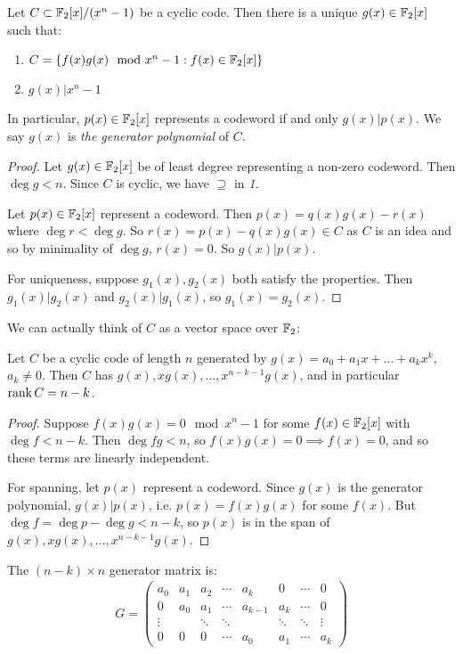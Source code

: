 \documentclass[10pt,a4paper]{article}
\begin{document}
\begin{theorem}
Let $C \subset \mathbb{F}_2[x]/(x^n-1)$ be a cyclic code. Then there is a unique $g(x) \in \mathbb{F}_2[x]$ such that:
\begin{enumerate}
\item $C = \{f(x)g(x) \mod x^n-1 : f(x) \in \mathbb{F}_2[x]\}$
\item $g(x) | x^n-1$
\end{enumerate}
In particular, $p(x) \in \mathbb{F}_2[x]$ represents a codeword if and only $g(x)|p(x)$. We say $g(x)$ is \emph{the generator polynomial} of $C$.
\end{theorem}
\begin{proof}
Let $g(x) \in \mathbb{F}_2[x]$ be of least degree representing a non-zero codeword. Then $\deg g < n$. Since $C$ is cyclic, we have $\supseteq$ in \textit{1.}

Let $p(x) \in \mathbb{F}_2[x]$ represent a codeword. Then $p(x) = q(x)g(x)-r(x)$ where $\deg r < \deg g$. So $r(x) = p(x) - q(x)g(x) \in C$ as $C$ is an idea and so by minimality of $\deg g$, $r(x) = 0$. So $g(x)|p(x)$.

For uniqueness, suppose $g_1(x), g_2(x)$ both satisfy the properties. Then $g_1(x)|g_2(x)$ and $g_2(x)|g_1(x)$, so $g_1(x) = g_2(x)$.
\end{proof}
We can actually think of $C$ as a vector space over $\mathbb{F}_2$:
\begin{lemma}
Let $C$ be a cyclic code of length $n$ generated by $g(x) = a_0 + a_1 x+\ldots +a_{k}x^k$, $a_k \neq 0$. Then $C$ has $g(x), xg(x), \ldots, x^{n-k-1}g(x)$, and in particular $\operatorname{rank} C = n-k$.
\end{lemma}
\begin{proof}
Suppose $f(x)g(x) = 0 \mod x^n-1$ for some $f(x) \in \mathbb{F}_2[x]$ with $\deg f < n-k$. Then $\deg fg < n$, so $f(x)g(x) = 0 \implies f(x) = 0$, and so these terms are linearly independent.

For spanning, let $p(x)$ represent a codeword. Since $g(x)$ is the generator polynomial, $g(x)|p(x)$, i.e. $p(x) = f(x)g(x)$ for some $f(x)$. But $\deg f = \deg p - \deg g < n-k$, so $p(x)$ is in the span of $g(x), xg(x), \ldots, x^{n-k-1}g(x)$.
\end{proof}
\begin{corollary}
The $(n-k)\times n$ generator matrix is:
\begin{align*}
G = \begin{pmatrix} a_0 & a_1 & a_2 & \cdots & a_k & 0 & \cdots & 0 \\
0 & a_0 & a_1 & \cdots & a_{k-1} & a_k & \cdots & 0\\
\vdots & & \ddots & \ddots & & \ddots & \ddots & \vdots\\
0 & 0 & 0 & \cdots & a_0 & a_1 & \cdots & a_k\end{pmatrix}
\end{align*}
\end{corollary}
\end{document}
